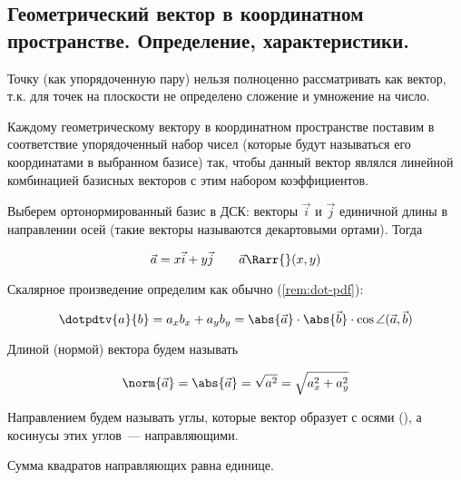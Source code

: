 \subsection{%
  Геометрический вектор в координатном пространстве. Определение,
  характеристики.%
}

\begin{remark}
  Точку (как упорядоченную пару) нельзя полноценно рассматривать как вектор,
  т.к. для точек на плоскости не определено сложение и умножение на число.
\end{remark}

Каждому геометрическому вектору в координатном пространстве поставим в
соответствие упорядоченный набор чисел (которые будут называться его
координатами в выбранном базисе) так, чтобы данный вектор являлся линейной
комбинацией базисных векторов с этим набором коэффициентов.

Выберем  ортонормированный базис в ДСК: векторы \(\vec{i}\) и
\(\vec{j}\) единичной длины в направлении осей (такие векторы называются
декартовыми ортами). Тогда 

\begin{equation*}
  \vec{a} = x \vec{i} + y \vec{j}
  \qquad
  \vec{a} \Rarr{} (x, y)
\end{equation*}

Скалярное произведение определим как обычно (\ref{rem:dot-pdf}):

\begin{equation*}
  \dotpdtv{a}{b}
  = a_x b_x + a_y b_y
  = \abs{\vec{a}} \cdot \abs{\vec{b}} \cdot \cos \angle (\vec{a}, \vec{b})
\end{equation*}

\begin{definition} \label{def:vec-len}
  Длиной (нормой) вектора будем называть

  \begin{equation*}
    \norm{\vec{a}}
    = \abs{\vec{a}}
    = \sqrt{a^2}
    = \sqrt{a_x^2 + a_y^2}
  \end{equation*}
\end{definition}

\begin{definition}
  Направлением будем называть углы, которые вектор образует с осями
  (), а косинусы этих углов~--- направляющими.
\end{definition}


\begin{theorem}
  Сумма квадратов направляющих равна единице.
\end{theorem}

